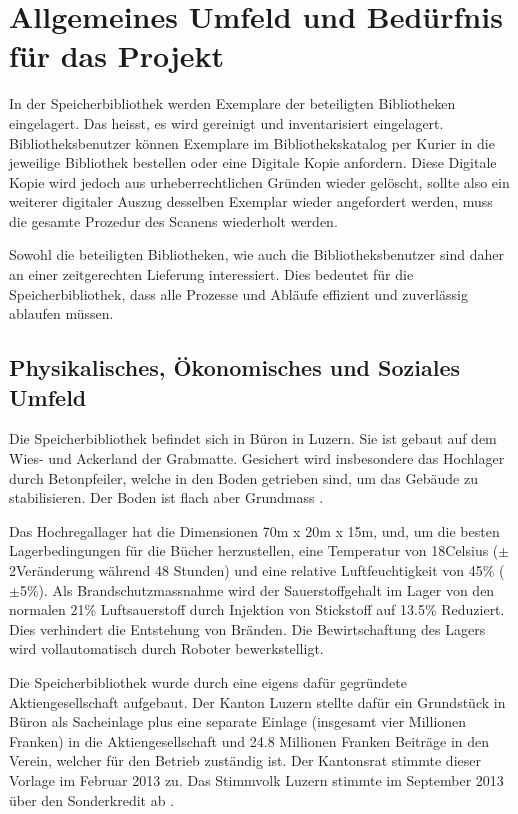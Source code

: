 \chapter{Allgemeines Umfeld und Bedürfnis für das Projekt}
In der Speicherbibliothek werden Exemplare der beteiligten Bibliotheken eingelagert. Das heisst, es wird gereinigt und inventarisiert eingelagert. Bibliotheksbenutzer können Exemplare im Bibliothekskatalog per Kurier in die jeweilige Bibliothek bestellen oder eine Digitale Kopie anfordern. Diese Digitale Kopie wird jedoch aus urheberrechtlichen Gründen wieder gelöscht, sollte also ein weiterer digitaler Auszug desselben Exemplar wieder angefordert werden, muss die gesamte Prozedur des Scanens wiederholt werden.

Sowohl die beteiligten Bibliotheken, wie auch die Bibliotheksbenutzer sind daher an einer zeitgerechten Lieferung interessiert. Dies bedeutet für die Speicherbibliothek, dass alle Prozesse und Abläufe effizient und zuverlässig ablaufen müssen.

\section{Physikalisches, Ökonomisches und Soziales Umfeld}
Die Speicherbibliothek befindet sich in Büron in Luzern. Sie ist gebaut auf dem Wies- und Ackerland der Grabmatte. Gesichert wird insbesondere das Hochlager durch Betonpfeiler, welche in den Boden getrieben sind, um das Gebäude zu stabilisieren. Der Boden ist flach aber Grundmass \parencite{MapGeoAdmin2019}.

Das Hochregallager hat die Dimensionen 70m x 20m x 15m, und, um die besten Lagerbedingungen für die Bücher herzustellen, eine Temperatur von 18\SIUnitSymbolDegree Celsius ($\pm$ 2\SIUnitSymbolDegree Veränderung während 48 Stunden) und eine relative Luftfeuchtigkeit von 45\% ($\pm$5\%). Als Brandschutzmassnahme wird der Sauerstoffgehalt im Lager von den normalen 21\% Luftsauerstoff durch Injektion von Stickstoff auf 13.5\% Reduziert. Dies verhindert die Entstehung von Bränden.
Die Bewirtschaftung des Lagers wird vollautomatisch durch Roboter bewerkstelligt.

Die Speicherbibliothek wurde durch eine eigens dafür gegründete Aktiengesellschaft aufgebaut. Der Kanton Luzern stellte dafür ein Grundstück in Büron als Sacheinlage plus eine separate Einlage (insgesamt vier Millionen Franken) in die Aktiengesellschaft und 24.8 Millionen Franken Beiträge in den Verein, welcher für den Betrieb zuständig ist. Der Kantonsrat stimmte dieser Vorlage im Februar 2013 zu. Das Stimmvolk Luzern stimmte im September 2013 über den Sonderkredit ab  \parencite{KantonLuzern2013}.

